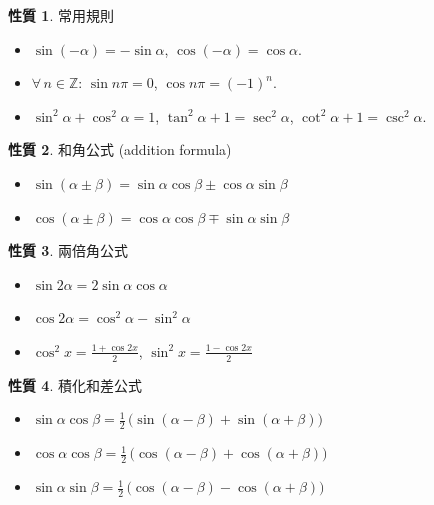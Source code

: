 \documentclass[12pt]{extarticle}
\newcommand{\ds}{\displaystyle}
\theoremstyle{definition}
\newtheorem*{prp}{性質}
\begin{document}
\begin{prp} 常用規則
  \setlength{\columnsep}{-30mm}
  \begin{multicols}{2}
    \begin{itemize}\setlength\itemsep{0em}
      \item $\sin(-\alpha) = -\sin\alpha$, $\cos(-\alpha) = \cos\alpha$. 
      \item $\forall\,n\in\mathbb{Z}$:  $\sin n\pi = 0$, $\cos n\pi = (-1)^n$. 
      \item $\sin^2\alpha + \cos^2\alpha = 1$, $\tan^2\alpha + 1 = \sec^2\alpha$, $\cot^2\alpha + 1 = \csc^2\alpha$. 
    \end{itemize}
  \end{multicols}
\end{prp}

\begin{prp} 和角公式 (addition formula)  
  \setlength{\columnsep}{-0mm}
  \begin{multicols}{2}
    \begin{itemize}\setlength\itemsep{0em}
      \item $\sin(\alpha\pm\beta) = \sin\alpha\cos\beta\pm\cos\alpha\sin\beta$
      \item $\cos(\alpha\pm\beta) = \cos\alpha\cos\beta\mp\sin\alpha\sin\beta$
    \end{itemize}
  \end{multicols}
\end{prp}

\begin{prp} 兩倍角公式 
  \setlength{\columnsep}{-0mm}
  \begin{multicols}{2}
    \begin{itemize}\setlength\itemsep{0em}
      \item $\ds\sin 2\alpha = 2\sin\alpha\cos\alpha$
      \item $\ds\cos 2\alpha = \cos^2\alpha - \sin^2\alpha$
      \item $\ds\cos^2 x = \frac{1 + \cos 2x}{2}$, $\ds\sin^2 x = \frac{1 - \cos 2x}{2}$
    \end{itemize}
  \end{multicols}
\end{prp}

\begin{prp} 積化和差公式 
  \setlength{\columnsep}{-0mm}
  \begin{multicols}{2}
    \begin{itemize}\setlength\itemsep{0em}
      \item $\ds\sin\alpha\cos\beta = \frac{1}{2}\,\big(\sin(\alpha - \beta) + \sin(\alpha + \beta)\big)$
      \item $\ds\cos\alpha\cos\beta = \frac{1}{2}\,\big(\cos(\alpha - \beta) + \cos(\alpha + \beta)\big)$
      \item $\ds\sin\alpha\sin\beta = \frac{1}{2}\,\big(\cos(\alpha - \beta) - \cos(\alpha + \beta)\big)$
    \end{itemize}
  \end{multicols}
\end{prp}
\end{document}
